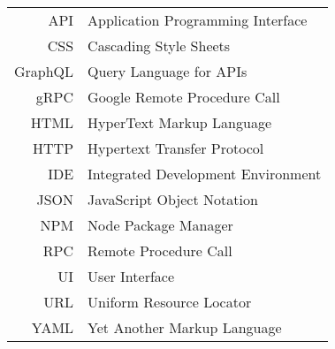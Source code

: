 \documentclass[english,master,unicode,oneside]{ctufit-thesis}
\theoremstyle{plain}
\theoremstyle{definition}
\theoremstyle{remark}
\numberwithin{theorem}{chapter}
\begin{document}
    \begin{tabular}{rl}
        API     & Application Programming Interface  \\
        CSS     & Cascading Style Sheets             \\
        GraphQL & Query Language for APIs            \\
        gRPC    & Google Remote Procedure Call       \\
        HTML    & HyperText Markup Language          \\
        HTTP    & Hypertext Transfer Protocol        \\
        IDE     & Integrated Development Environment \\
        JSON    & JavaScript Object Notation         \\
        NPM     & Node Package Manager               \\
        RPC     & Remote Procedure Call              \\
        UI      & User Interface                     \\
        URL     & Uniform Resource Locator           \\
        YAML    & Yet Another Markup Language        \\
    \end{tabular}

    \mainmatter\mainmatterinit %



    \appendix\appendixinit %


    \backmatter %

    \setcounter{biburllcpenalty}{7000}
    \setcounter{biburlucpenalty}{8000}
    \printbibliography %

\end{document}

